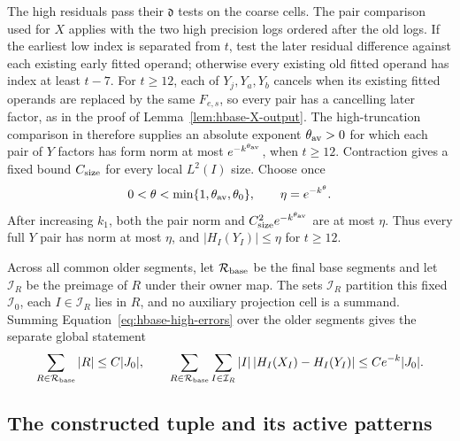 The high residuals pass their \(\mathfrak d\) tests on the coarse
cells.  The pair comparison used for \(X\) applies with the two high
precision logs ordered after the old logs.  If the earliest low
index is separated from \(t\), test the later residual difference
against each existing early fitted operand; otherwise every existing
old fitted operand has index at least \(t-7\).  For \(t\ge12\), each of
\(Y_j,Y_a,Y_b\) cancels when its existing fitted operands are replaced
by the same \(F_{e,s}\), so every pair has a cancelling later factor,
as in the proof of Lemma~\ref{lem:hbase-X-output}.  The high-truncation comparison in
\cite[Section~5]{H} therefore supplies an absolute exponent
\(\theta_{\rm av}>0\) for which each pair of \(Y\) factors has form
norm at most \(e^{-k^{\theta_{\rm av}}}\), when \(t\ge12\).
Contraction gives a fixed bound \(C_{\rm size}\) for every local
\(L^2(I)\) size.  Choose once
\begin{equation}
 0<\theta<\min\{1,\theta_{\rm av},\theta_0\},\qquad
 \eta=e^{-k^\theta}.                                          \label{eq:hbase-quality}
\end{equation}
After increasing \(k_1\), both the pair norm and
\(C_{\rm size}^2e^{-k^{\theta_{\rm av}}}\) are at most \(\eta\).
Thus every full \(Y\) pair has norm at most \(\eta\), and
\(|H_I(Y_I)|\le\eta\) for \(t\ge12\).

Across all common older segments, let \(\mathcal R_{\rm base}\) be the
final base segments and let \(\mathcal I_R\) be the preimage of \(R\)
under their owner map.  The sets \(\mathcal I_R\) partition this fixed
\(\mathcal I_0\), each
\(I\in\mathcal I_R\) lies in \(R\), and no auxiliary projection
cell is a summand.  Summing Equation~\eqref{eq:hbase-high-errors}
over the older segments gives the separate global statement
\begin{equation}
 \sum_{R\in\mathcal R_{\rm base}}|R|\le C|J_0|,\qquad
 \sum_{R\in\mathcal R_{\rm base}}\sum_{I\in\mathcal I_R}
       |I|\,|H_I(X_I)-H_I(Y_I)|\le Ce^{-k}|J_0|.              \label{eq:hbase-high-replacement}
\end{equation}

\subsection{The constructed tuple and its active patterns}

